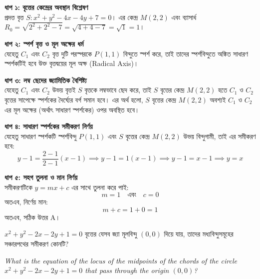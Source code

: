 \documentclass[12pt, a4paper]{article}
\begin{document}
\begin{tcolorbox}[solutionbox={সমাধান (Solution)}]
    \noindent
    \textbf{ধাপ ১: বৃত্তের কেন্দ্রের অবস্থান বিশ্লেষণ} \\
    প্রদত্ত বৃত্ত $S: x^2 + y^2 - 4x - 4y + 7 = 0$। 
    এর কেন্দ্র $M(2, 2)$ এবং ব্যাসার্ধ $R_0 = \sqrt{2^2 + 2^2 - 7} = \sqrt{4 + 4 - 7} = \sqrt{1} = 1$।
    
    \vspace{0.5em}
    \noindent\textbf{ধাপ ২: স্পর্শ বৃত্ত ও মূল অক্ষের ধর্ম} \\
    যেহেতু $C_1$ এবং $C_2$ বৃত্ত দুটি পরস্পরকে $P(1, 1)$ বিন্দুতে স্পর্শ করে, তাই তাদের স্পর্শবিন্দুতে অঙ্কিত সাধারণ স্পর্শকটিই হবে উক্ত বৃত্তদ্বয়ের মূল অক্ষ (Radical Axis)।
    
    \vspace{0.5em}
    \noindent\textbf{ধাপ ৩: লম্ব ছেদের জ্যামিতিক বৈশিষ্ট্য} \\
    যেহেতু $C_1$ এবং $C_2$ উভয় বৃত্তই $S$ বৃত্তকে লম্বভাবে ছেদ করে, তাই $S$ বৃত্তের কেন্দ্র $M(2, 2)$ হতে $C_1$ ও $C_2$ বৃত্তের সাপেক্ষে স্পর্শকের দৈর্ঘ্যের বর্গ সমান হবে। এর অর্থ হলো, $S$ বৃত্তের কেন্দ্র $M(2, 2)$ অবশ্যই $C_1$ ও $C_2$ এর মূল অক্ষের (অর্থাৎ সাধারণ স্পর্শকের) ওপর অবস্থিত হবে।
    
    \vspace{0.5em}
    \noindent\textbf{ধাপ ৪: সাধারণ স্পর্শকের সমীকরণ নির্ণয়} \\
    যেহেতু সাধারণ স্পর্শকটি স্পর্শবিন্দু $P(1, 1)$ এবং $S$ বৃত্তের কেন্দ্র $M(2, 2)$ উভয় বিন্দুগামী, তাই এর সমীকরণ হবে:
    \[ y - 1 = \frac{2 - 1}{2 - 1}(x - 1) \implies y - 1 = 1(x - 1) \implies y - 1 = x - 1 \implies y = x \]
    
    \vspace{0.5em}
    \noindent\textbf{ধাপ ৫: সহগ তুলনা ও মান নির্ণয়} \\
    সমীকরণটিকে $y = mx + c$ এর সাথে তুলনা করে পাই:
    \[ m = 1 \quad \text{এবং} \quad c = 0 \]
    অতএব, নির্ণেয় মান:
    \[ m + c = 1 + 0 = 1 \]
    অতএব, সঠিক উত্তর A।
\end{tcolorbox}
\begin{tcolorbox}[questionbox={প্রশ্ন (Question) 13}]
    \noindent
    $x^2 + y^2 - 2x - 2y + 1 = 0$ বৃত্তের যেসব জ্যা মূলবিন্দু $(0, 0)$ দিয়ে যায়, তাদের মধ্যবিন্দুসমূহের সঞ্চারপথের সমীকরণ কোনটি?
    
    \vspace{0.8em}
    \begin{english}
    \noindent\textit{\color{darkgray}
    What is the equation of the locus of the midpoints of the chords of the circle $x^2 + y^2 - 2x - 2y + 1 = 0$ that pass through the origin $(0, 0)$?
    }
    \end{english}
\end{tcolorbox}
\end{document}
